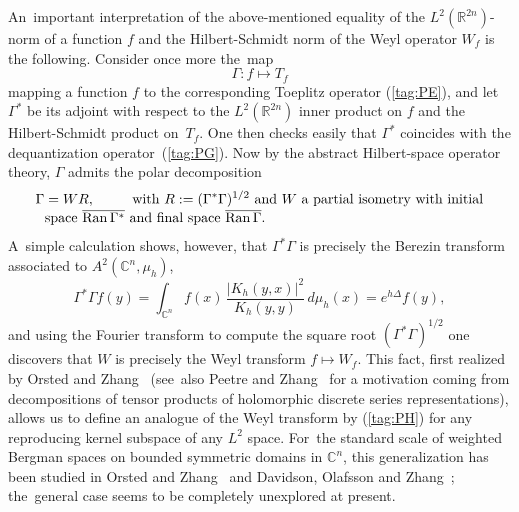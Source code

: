 \documentclass[12pt]{amsart}
\numberwithin{equation}{section}
\theoremstyle{remark}
\newcommand\RR{\mathbb R}
\newcommand{\CC}{\C}
\newcommand{\C}{\mathbb C}
\begin{document}
An~important interpretation of the above-mentioned equality of the
$L^2(\RR^{2n})$-norm of a function $f$ and the Hilbert-Schmidt norm of the Weyl
operator $W_f$ is the following. Consider once more the~map
$$ \Gamma: f\mapsto T_f  $$
mapping a function $f$ to the corresponding Toeplitz operator (\ref{tag:PE}),
and let $\Gamma^*$ be its adjoint with respect to the $L^2(\RR^{2n})$ inner
product on $f$ and the Hilbert-Schmidt product on~$T_f$. One then checks easily
that $\Gamma^*$ coincides with the dequantization operator~(\ref{tag:PG}). Now
by the abstract Hilbert-space operator theory, $\Gamma$ admits the polar
decomposition
\begin{equation}  \begin{aligned}
& \Gamma = W R,  \qquad\text{with $R:=(\Gamma^*\Gamma)^{1/2}$ and $W$ a partial
isometry with initial} \\
\noalign{\vskip-3pt}
& \text{space $\overline{\operatorname{Ran}\Gamma^*}$ and final space
$\overline{\operatorname{Ran}\Gamma}$.}  \end{aligned}  \label{tag:PH}
\end{equation}
A~simple calculation shows, however, that $\Gamma^*\Gamma$ is precisely the
Berezin transform associated to $A^2(\CC^n,\mu_h)$,
$$ \Gamma^*\Gamma f(y) = \int_{\CC^n} f(x) \, \frac{|K_h(y,x)|^2}{K_h(y,y)}
\, d\mu_h(x) = e^{h\Delta} f(y),  $$
and using the Fourier transform to compute the square root
$(\Gamma^*\Gamma)^{1/2}$ one discovers that $W$ is precisely the Weyl transform
$f\mapsto W_f$. This fact, first realized by Orsted and Zhang~\cite{bib:OeZ}
(see~also Peetre and Zhang~\cite{bib:PeeZh} for a motivation coming from
decompositions of tensor products of holomorphic discrete series
representations), allows us to define an analogue of the Weyl transform by
(\ref{tag:PH}) for any reproducing kernel subspace of any $L^2$ space. For~the
standard scale of weighted Bergman spaces on bounded symmetric domains in
$\CC^n$, this generalization has been studied in Orsted and
Zhang~\cite{bib:OeZ} and Davidson, Olafsson and Zhang~\cite{bib:+Olaf};
the~general case seems to be completely unexplored at present.
\end{document}
